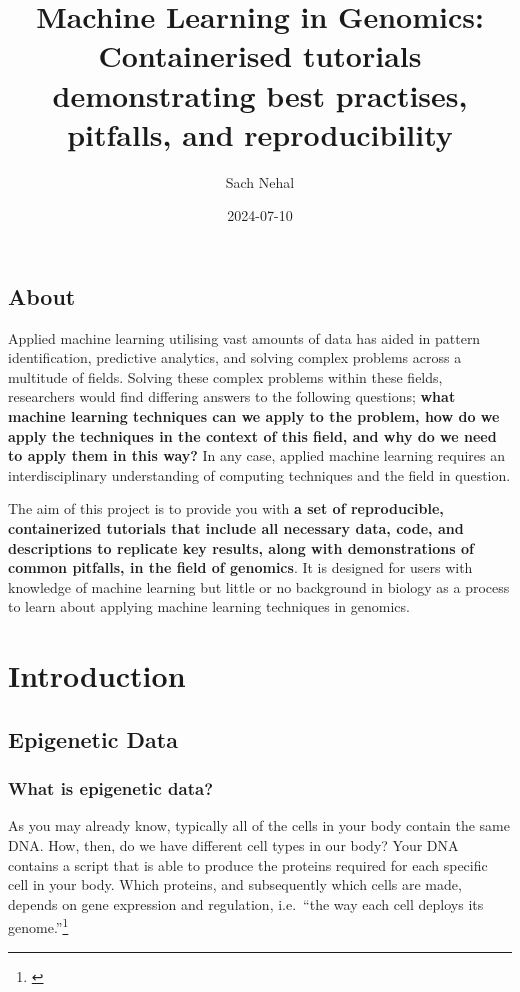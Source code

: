 \documentclass[
]{book}
\title{Machine Learning in Genomics: Containerised tutorials demonstrating best practises, pitfalls, and reproducibility}
\author{Sach Nehal}
\date{2024-07-10}
\begin{document}
\maketitle

{
\setcounter{tocdepth}{1}
\tableofcontents
}
\chapter*{About}\label{about}

Applied machine learning utilising vast amounts of data has aided in pattern identification, predictive analytics, and solving complex problems across a multitude of fields. Solving these complex problems within these fields, researchers would find differing answers to the following questions; \textbf{what machine learning techniques can we apply to the problem, how do we apply the techniques in the context of this field, and why do we need to apply them in this way?} In any case, applied machine learning requires an interdisciplinary understanding of computing techniques and the field in question.

The aim of this project is to provide you with \textbf{a set of reproducible, containerized tutorials that include all necessary data, code, and descriptions to replicate key results, along with demonstrations of common pitfalls, in the field of genomics}. It is designed for users with knowledge of machine learning but little or no background in biology as a process to learn about applying machine learning techniques in genomics.

\part{Introduction}\label{part-introduction}

\chapter{Epigenetic Data}\label{epigenetic-data}

\section{What is epigenetic data?}\label{what-is-epigenetic-data}

As you may already know, typically all of the cells in your body contain the same DNA. How, then, do we have different cell types in our body? Your DNA contains a script that is able to produce the proteins required for each specific cell in your body. Which proteins, and subsequently which cells are made, depends on gene expression and regulation, i.e.~``the way each cell deploys its genome.''\footnote{\citet{ralston2008}}
\end{document}
